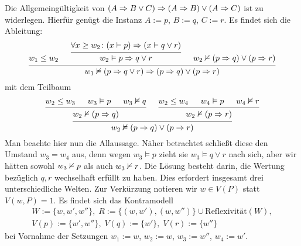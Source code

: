Die Allgemeingültigkeit von $(A\Rightarrow B\lor C)\Rightarrow (A\Rightarrow B)\lor (A\Rightarrow C)$
ist zu widerlegen. Hierfür genügt die Instanz $A:=p$, $B:=q$, $C:=r$.
Es findet sich die Ableitung:
\[\begin{prooftree}
  \hypo{w_1\le w_2}
    \hypo{\forall x\ge w_2\colon (x\models p)\Rightarrow (x\models q\lor r)}
  \infer1{w_2\models p\cond q\lor r}
  \hypo{w_2\refutes (p\cond q)\lor (p\cond r)}
\infer3{w_1\refutes (p\cond q\lor r)\cond (p\cond q)\lor (p\cond r)}
\end{prooftree}\]
mit dem Teilbaum
\[\begin{prooftree}
    \hypo{w_2\le w_3}
    \hypo{w_3\models p}
    \hypo{w_3\refutes q}
  \infer3{w_2\refutes (p\cond q)}
    \hypo{w_2\le w_4}
    \hypo{w_4\models p}
    \hypo{w_4\refutes r}
  \infer3{w_2\refutes (p\cond r)}
\infer2{w_2\refutes (p\cond q)\lor (p\cond r)}
\end{prooftree}\]
Man beachte hier nun die Allaussage. Näher betrachtet schließt diese
den Umstand $w_3=w_4$ aus, denn wegen $w_3\models p$ zieht sie
$w_3\models q\lor r$ nach sich, aber wir hätten sowohl $w_3\nvDash p$
als auch $w_3\nvDash r$. Die Lösung besteht darin, die Wertung
bezüglich $q,r$ wechselhaft erfüllt zu haben. Dies erfordert insgesamt
drei unterschiedliche Welten. Zur Verkürzung notieren wir $w\in V(P)$
statt $V(w,P)=1$. Es findet sich das Kontramodell
\begin{gather*}
W:=\{w,w',w''\},\; R := \{(w,w'),(w,w'')\}\cup\text{Reflexivität}(W),\\
V(p):=\{w',w''\},\; V(q):=\{w'\},\; V(r):=\{w''\}
\end{gather*}
bei Vornahme der Setzungen $w_1:=w$, $w_2:=w$, $w_3:=w''$, $w_4:=w'$.